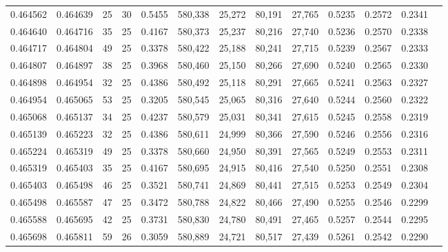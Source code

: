 \begin{tabular}{rrrrrrrrrrrrr}
0.464562 & 0.464639 &    25 &  30 &                                     0.5455 & 580,338 &  25,272 &  80,191 &  27,765 & 0.5235 & 0.2572 & 0.2341 \\
0.464640 & 0.464716 &    35 &  25 &                                     0.4167 & 580,373 &  25,237 &  80,216 &  27,740 & 0.5236 & 0.2570 & 0.2338 \\
0.464717 & 0.464804 &    49 &  25 &                                     0.3378 & 580,422 &  25,188 &  80,241 &  27,715 & 0.5239 & 0.2567 & 0.2333 \\
0.464807 & 0.464897 &    38 &  25 &                                     0.3968 & 580,460 &  25,150 &  80,266 &  27,690 & 0.5240 & 0.2565 & 0.2330 \\
0.464898 & 0.464954 &    32 &  25 &                                     0.4386 & 580,492 &  25,118 &  80,291 &  27,665 & 0.5241 & 0.2563 & 0.2327 \\
0.464954 & 0.465065 &    53 &  25 &                                     0.3205 & 580,545 &  25,065 &  80,316 &  27,640 & 0.5244 & 0.2560 & 0.2322 \\
0.465068 & 0.465137 &    34 &  25 &                                     0.4237 & 580,579 &  25,031 &  80,341 &  27,615 & 0.5245 & 0.2558 & 0.2319 \\
0.465139 & 0.465223 &    32 &  25 &                                     0.4386 & 580,611 &  24,999 &  80,366 &  27,590 & 0.5246 & 0.2556 & 0.2316 \\
0.465224 & 0.465319 &    49 &  25 &                                     0.3378 & 580,660 &  24,950 &  80,391 &  27,565 & 0.5249 & 0.2553 & 0.2311 \\
0.465319 & 0.465403 &    35 &  25 &                                     0.4167 & 580,695 &  24,915 &  80,416 &  27,540 & 0.5250 & 0.2551 & 0.2308 \\
0.465403 & 0.465498 &    46 &  25 &                                     0.3521 & 580,741 &  24,869 &  80,441 &  27,515 & 0.5253 & 0.2549 & 0.2304 \\
0.465498 & 0.465587 &    47 &  25 &                                     0.3472 & 580,788 &  24,822 &  80,466 &  27,490 & 0.5255 & 0.2546 & 0.2299 \\
0.465588 & 0.465695 &    42 &  25 &                                     0.3731 & 580,830 &  24,780 &  80,491 &  27,465 & 0.5257 & 0.2544 & 0.2295 \\
0.465698 & 0.465811 &    59 &  26 &                                     0.3059 & 580,889 &  24,721 &  80,517 &  27,439 & 0.5261 & 0.2542 & 0.2290 \\

\end{tabular}
